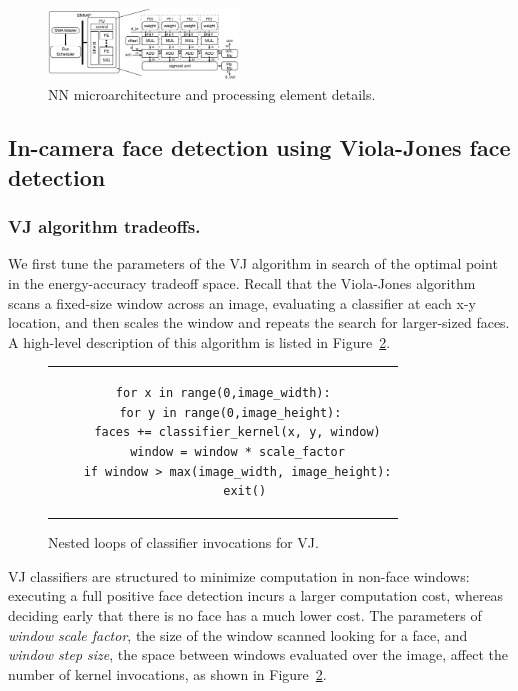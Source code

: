 \begin{figure}[h]
\centering
      \noindent
      \includegraphics[width=0.45\textwidth]{nsp-figs/snnap_pu_new.pdf}
    \caption{NN microarchitecture and processing element details.}
    \label{fig:snnap-pu}
\end{figure}

\subsection{In-camera face detection using Viola-Jones face detection}

\subsubsection{VJ algorithm tradeoffs.}
We first tune the parameters of the VJ algorithm in search of the optimal point in the energy-accuracy tradeoff space.
Recall that the Viola-Jones algorithm scans a fixed-size window across an image,
evaluating a classifier at each x-y location, and then scales the window and repeats
the search for larger-sized faces.
A high-level description of this algorithm is listed in Figure~\ref{fig:vj-algo}.

\begin{figure}[h]
\centering          %
\begin{tabular}{c}  %
\begin{lstlisting}
for x in range(0,image_width):
  for y in range(0,image_height):
    faces += classifier_kernel(x, y, window)
    window = window * scale_factor
    if window > max(image_width, image_height):
      exit()
\end{lstlisting}
\end{tabular}
\caption{Nested loops of classifier invocations for VJ.}
\label{fig:vj-algo}
\end{figure}


VJ classifiers are structured to minimize computation in non-face windows: executing a full positive face detection incurs a larger computation cost, whereas deciding early that there is no face has a much lower cost.
The parameters of \textit{window scale factor}, the size of the window scanned looking for a face, and \textit{window step size}, the space between windows evaluated over the image, affect the number of kernel invocations, as shown in Figure~\ref{fig:vj-algo}.

